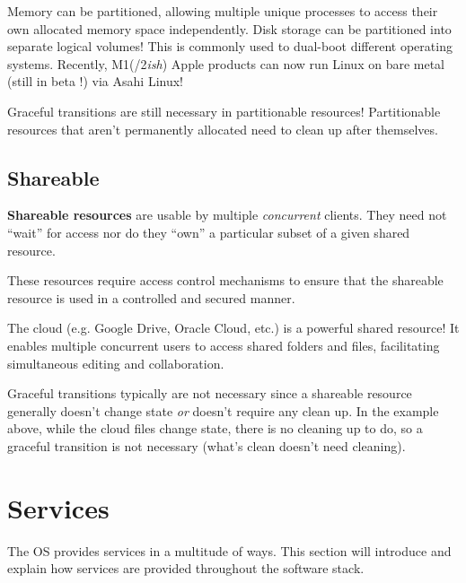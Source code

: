 \documentclass{report}
\begin{document}
\begin{tcolorbox}[colback=blue!5!white,colframe=black!75!blue,title=Example: Memory Mania and Disk Division]
  Memory can be partitioned, allowing multiple unique processes to access their own allocated memory
  space independently.
  \tcblower
  Disk storage can be partitioned into separate logical volumes! This is commonly used to dual-boot
  different operating systems. Recently, M1(/2\textit{ish}) Apple products can now run Linux on
  bare metal (still in beta !) via Asahi Linux!
\end{tcolorbox}

Graceful transitions are still necessary in partitionable resources! Partitionable resources that
aren't permanently allocated need to clean up after themselves.


\section{Shareable}

\begin{tcolorbox}[title=Definition: Shareable Resource]
  \textbf{Shareable resources} are usable by multiple \textit{concurrent} clients. They need not
  ``wait'' for access nor do they ``own'' a particular subset of a given shared resource. 
\end{tcolorbox}

These resources require access control mechanisms to ensure that the shareable resource is used in a
controlled and secured manner.

\begin{tcolorbox}[colback=blue!5!white,colframe=black!75!blue,title=Example: Cloud Crazy] 
  The cloud (e.g. Google Drive, Oracle Cloud, etc.) is a powerful shared resource! It enables
  multiple concurrent users to access shared folders and files, facilitating simultaneous editing
  and collaboration.
\end{tcolorbox}

Graceful transitions typically are not necessary since a shareable resource generally doesn't change
state \textit{or} doesn't require any clean up. In the example above, while the cloud files change
state, there is no cleaning up to do, so a graceful transition is not necessary (what's clean
doesn't need cleaning).





\chapter{Services}
The OS provides services in a multitude of ways. This section will introduce and explain how
services are provided throughout the software stack.
\end{document}

